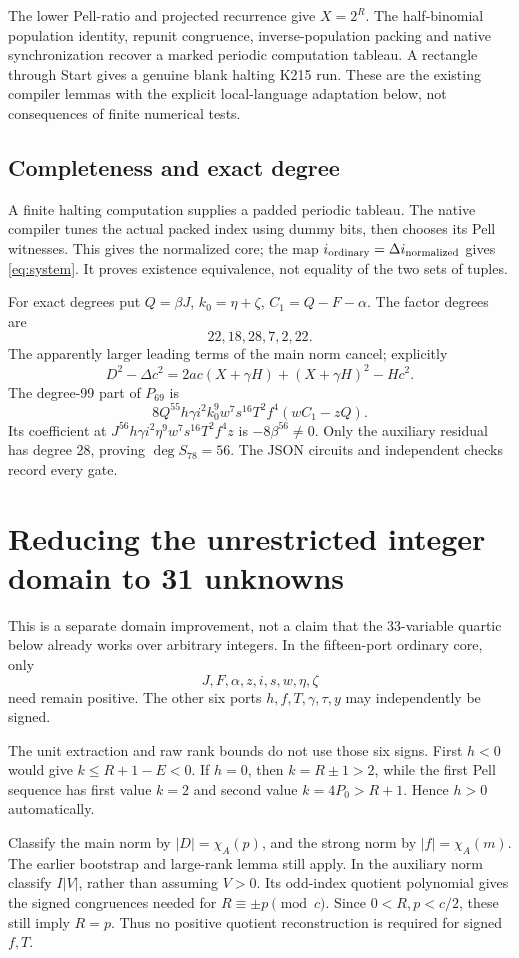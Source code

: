 \documentclass[11pt]{article}
\begin{document}
The lower Pell-ratio and projected recurrence give $X=2^R$. The half-binomial population identity, repunit congruence, inverse-population packing and native synchronization recover a marked periodic computation tableau. A rectangle through Start gives a genuine blank halting K215 run. These are the existing compiler lemmas with the explicit local-language adaptation below, not consequences of finite numerical tests.

\subsection{Completeness and exact degree}
A finite halting computation supplies a padded periodic tableau. The native compiler tunes the actual packed index using dummy bits, then chooses its Pell witnesses. This gives the normalized core; the map $i_{\rm ordinary}=\Delta i_{\rm normalized}$ gives \eqref{eq:system}. It proves existence equivalence, not equality of the two sets of tuples.

For exact degrees put $Q=\beta J$, $k_0=\eta+\zeta$, $C_1=Q-F-\alpha$. The factor degrees are
\[
22,18,28,7,2,22.
\]
The apparently larger leading terms of the main norm cancel; explicitly
\[
D^2-\Delta c^2=2ac(X+\gamma H)+(X+\gamma H)^2-Hc^2.
\]
The degree-99 part of $P_{69}$ is
\[
8Q^{55}h\gamma i^2k_0^9w^7s^{16}T^2f^4(wC_1-zQ).
\]
Its coefficient at $J^{56}h\gamma i^2\eta^9w^7s^{16}T^2f^4z$ is
$-8\beta^{56}\ne0$. Only the auxiliary residual has degree 28, proving $\deg S_{78}=56$. The JSON circuits and independent checks record every gate.
\section{Reducing the unrestricted integer domain to 31 unknowns}
This is a separate domain improvement, not a claim that the 33-variable quartic below already works over arbitrary integers. In the fifteen-port ordinary core, only
\[
J,F,\alpha,z,i,s,w,\eta,\zeta
\]
need remain positive. The other six ports $h,f,T,\gamma,\tau,y$ may independently be signed.

The unit extraction and raw rank bounds do not use those six signs. First $h<0$ would give $k\le R+1-E<0$. If $h=0$, then $k=R\pm1>2$, while the first Pell sequence has first value $k=2$ and second value $k=4P_0>R+1$. Hence $h>0$ automatically.

Classify the main norm by $|D|=\chi_A(p)$, and the strong norm by $|f|=\chi_A(m)$. The earlier bootstrap and large-rank lemma still apply. In the auxiliary norm classify $I|V|$, rather than assuming $V>0$. Its odd-index quotient polynomial gives the signed congruences needed for $R\equiv\pm p\pmod c$. Since $0<R,p<c/2$, these still imply $R=p$. Thus no positive quotient reconstruction is required for signed $f,T$.
\end{document}
